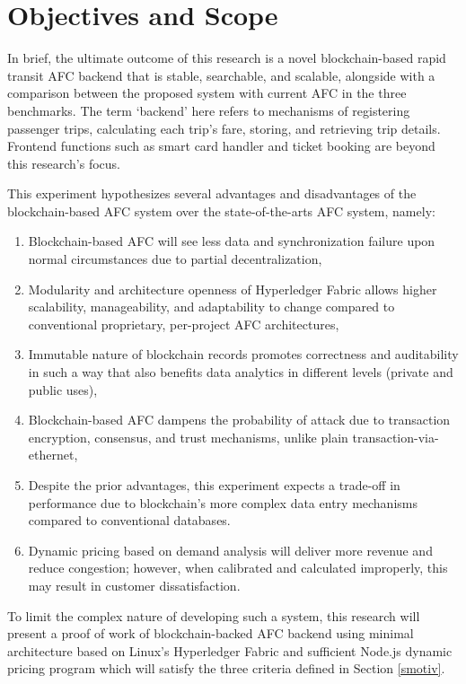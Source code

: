 \documentclass[a4paper,12pt,oneside, utf8x]{report}
\begin{document}
\section{Objectives and Scope}
In brief, the ultimate outcome of this research is a novel blockchain-based rapid transit AFC backend that is stable, searchable, and scalable, alongside with a comparison between the proposed system with current AFC in the three benchmarks. The term ‘backend’ here refers to mechanisms of registering passenger trips, calculating each trip’s fare, storing, and retrieving trip details. Frontend functions such as smart card handler and ticket booking are beyond this research’s focus.

This experiment hypothesizes several advantages and disadvantages of the blockchain-based AFC system over the state-of-the-arts AFC system, namely:
\begin{enumerate}
\item Blockchain-based AFC will see less data and synchronization failure upon normal circumstances due to partial decentralization,
\item Modularity and architecture openness of Hyperledger Fabric allows higher scalability, manageability, and adaptability to change compared to conventional proprietary, per-project AFC architectures,
\item Immutable nature of blockchain records promotes correctness and auditability in such a way that also benefits data analytics in different levels (private and public uses),
\item Blockchain-based AFC dampens the probability of attack due to transaction encryption, consensus, and trust mechanisms, unlike plain transaction-via-ethernet,
\item Despite the prior advantages, this experiment expects a trade-off in performance due to blockchain’s more complex data entry mechanisms compared to conventional databases.
\item Dynamic pricing based on demand analysis will deliver more revenue and reduce congestion; however, when calibrated and calculated improperly, this may result in customer dissatisfaction.
\end{enumerate}

To limit the complex nature of developing such a system, this research will present a proof of work of blockchain-backed AFC backend using minimal architecture based on Linux’s Hyperledger Fabric and sufficient Node.js dynamic pricing program which will satisfy the three criteria defined in Section \ref{smotiv}.
\end{document}
